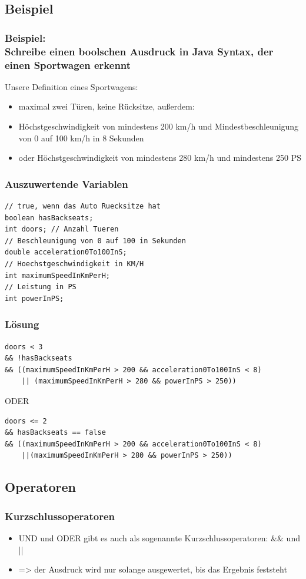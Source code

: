 \documentclass[final]{beamer}
\begin{document}
\subsection{Beispiel}
\begin{frame}
	\frametitle{Beispiel: \\Schreibe einen boolschen Ausdruck in Java Syntax, der einen Sportwagen erkennt}
	Unsere Definition eines Sportwagens:	\\
	\begin{itemize}
		\item{maximal zwei Türen, keine Rücksitze, außerdem:}
		\item{Höchstgeschwindigkeit von mindestens 200 km/h und  Mindestbeschleunigung von 0 auf 100 km/h in 8 Sekunden}
		\item{oder Höchstgeschwindigkeit von mindestens 280 km/h und mindestens 250 PS}
	\end{itemize}
\end{frame}

\begin{frame}[containsverbatim]
	\frametitle{Auszuwertende Variablen}
	\begin{lstlisting}
// true, wenn das Auto Ruecksitze hat
boolean hasBackseats;
int doors; // Anzahl Tueren
// Beschleunigung von 0 auf 100 in Sekunden
double acceleration0To100InS;
// Hoechstgeschwindigkeit in KM/H
int maximumSpeedInKmPerH;
// Leistung in PS
int powerInPS;
	\end{lstlisting}
\end{frame}

\begin{frame}[containsverbatim]
	\frametitle{Lösung}
\begin{lstlisting}
doors < 3
&& !hasBackseats
&& ((maximumSpeedInKmPerH > 200 && acceleration0To100InS < 8)
	|| (maximumSpeedInKmPerH > 280 && powerInPS > 250))
\end{lstlisting}
\vfill
ODER
\vfill
\begin{lstlisting}
doors <= 2
&& hasBackseats == false
&& ((maximumSpeedInKmPerH > 200 && acceleration0To100InS < 8)
	||(maximumSpeedInKmPerH > 280 && powerInPS > 250))
\end{lstlisting}

\end{frame}

\subsection{Operatoren}
\begin{frame}
	\frametitle{Kurzschlussoperatoren}
	\begin{itemize}
		\item{UND und ODER gibt es auch als sogenannte Kurzschlussoperatoren: \&\& und ||}
		\item{=> der Ausdruck wird nur solange ausgewertet, bis das Ergebnis feststeht}
	\end{itemize}
\end{frame}
\end{document}
